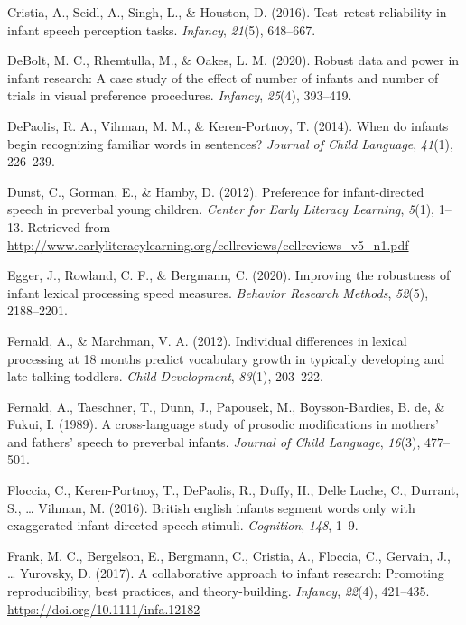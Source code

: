\documentclass[
  english,
  man,floatsintext]{apa6}
\newlength{\cslhangindent}
\newlength{\cslentryspacingunit} %
\newenvironment{CSLReferences}[2] %
 {%
  \setlength{\parindent}{0pt}
  \ifodd #1
  \let\oldpar\par
  \def\par{\hangindent=\cslhangindent\oldpar}
  \fi
  \setlength{\parskip}{#2\cslentryspacingunit}
 }%
 {}
\begin{document}
\begin{CSLReferences}{1}{0}
\leavevmode{}%
Cristia, A., Seidl, A., Singh, L., \& Houston, D. (2016). Test--retest reliability in infant speech perception tasks. \emph{Infancy}, \emph{21}(5), 648--667.

\leavevmode{}%
DeBolt, M. C., Rhemtulla, M., \& Oakes, L. M. (2020). Robust data and power in infant research: A case study of the effect of number of infants and number of trials in visual preference procedures. \emph{Infancy}, \emph{25}(4), 393--419.

\leavevmode{}%
DePaolis, R. A., Vihman, M. M., \& Keren-Portnoy, T. (2014). When do infants begin recognizing familiar words in sentences? \emph{Journal of Child Language}, \emph{41}(1), 226--239.

\leavevmode{}%
Dunst, C., Gorman, E., \& Hamby, D. (2012). Preference for infant-directed speech in preverbal young children. \emph{Center for Early Literacy Learning}, \emph{5}(1), 1--13. Retrieved from \url{http://www.earlyliteracylearning.org/cellreviews/cellreviews_v5_n1.pdf}

\leavevmode{}%
Egger, J., Rowland, C. F., \& Bergmann, C. (2020). Improving the robustness of infant lexical processing speed measures. \emph{Behavior Research Methods}, \emph{52}(5), 2188--2201.

\leavevmode{}%
Fernald, A., \& Marchman, V. A. (2012). Individual differences in lexical processing at 18 months predict vocabulary growth in typically developing and late-talking toddlers. \emph{Child Development}, \emph{83}(1), 203--222.

\leavevmode{}%
Fernald, A., Taeschner, T., Dunn, J., Papousek, M., Boysson-Bardies, B. de, \& Fukui, I. (1989). A cross-language study of prosodic modifications in mothers' and fathers' speech to preverbal infants. \emph{Journal of Child Language}, \emph{16}(3), 477--501.

\leavevmode{}%
Floccia, C., Keren-Portnoy, T., DePaolis, R., Duffy, H., Delle Luche, C., Durrant, S., \ldots{} Vihman, M. (2016). British english infants segment words only with exaggerated infant-directed speech stimuli. \emph{Cognition}, \emph{148}, 1--9.

\leavevmode{}%
Frank, M. C., Bergelson, E., Bergmann, C., Cristia, A., Floccia, C., Gervain, J., \ldots{} Yurovsky, D. (2017). A collaborative approach to infant research: Promoting reproducibility, best practices, and theory-building. \emph{Infancy}, \emph{22}(4), 421--435. \url{https://doi.org/10.1111/infa.12182}


\end{CSLReferences}
\end{document}
